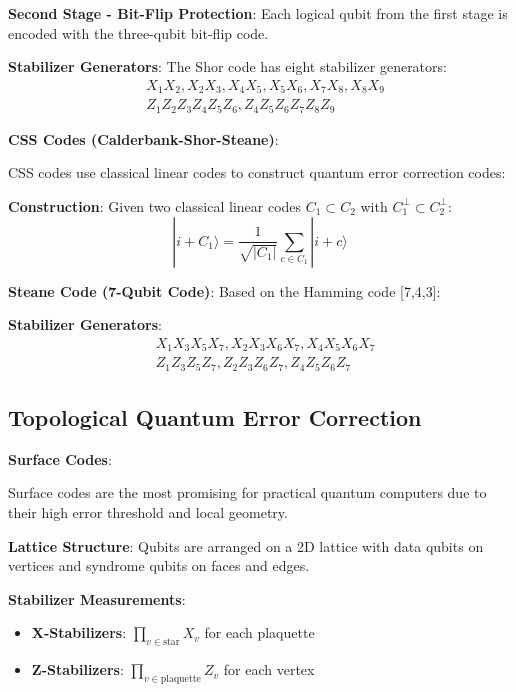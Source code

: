 \documentclass[12pt,a4paper]{article}
\theoremstyle{definition}
\theoremstyle{remark}
\begin{document}
	\textbf{Second Stage - Bit-Flip Protection}:
	Each logical qubit from the first stage is encoded with the three-qubit bit-flip code.
	
	\textbf{Stabilizer Generators}:
	The Shor code has eight stabilizer generators:
	\begin{align}
		&X_1X_2, X_2X_3, X_4X_5, X_5X_6, X_7X_8, X_8X_9 \\
		&Z_1Z_2Z_3Z_4Z_5Z_6, Z_4Z_5Z_6Z_7Z_8Z_9
	\end{align}
	
	\textbf{CSS Codes (Calderbank-Shor-Steane)}:
	
	CSS codes use classical linear codes to construct quantum error correction codes:
	
	\textbf{Construction}:
	Given two classical linear codes $C_1 \subset C_2$ with $C_1^\perp \subset C_2^\perp$:
	\begin{equation}
		|i + C_1\rangle = \frac{1}{\sqrt{|C_1|}} \sum_{c \in C_1} |i + c\rangle
	\end{equation}
	
	\textbf{Steane Code (7-Qubit Code)}:
	Based on the Hamming code [7,4,3]:
	
	\textbf{Stabilizer Generators}:
	\begin{align}
		&X_1X_3X_5X_7, X_2X_3X_6X_7, X_4X_5X_6X_7 \\
		&Z_1Z_3Z_5Z_7, Z_2Z_3Z_6Z_7, Z_4Z_5Z_6Z_7
	\end{align}
	
	\subsection{Topological Quantum Error Correction}
	
	\textbf{Surface Codes}:
	
	Surface codes are the most promising for practical quantum computers due to their high error threshold and local geometry.
	
	\textbf{Lattice Structure}:
	Qubits are arranged on a 2D lattice with data qubits on vertices and syndrome qubits on faces and edges.
	
	\textbf{Stabilizer Measurements}:
	\begin{itemize}
		\item \textbf{X-Stabilizers}: $\prod_{v \in \text{star}} X_v$ for each plaquette
		\item \textbf{Z-Stabilizers}: $\prod_{v \in \text{plaquette}} Z_v$ for each vertex
	\end{itemize}
	
\end{document}
